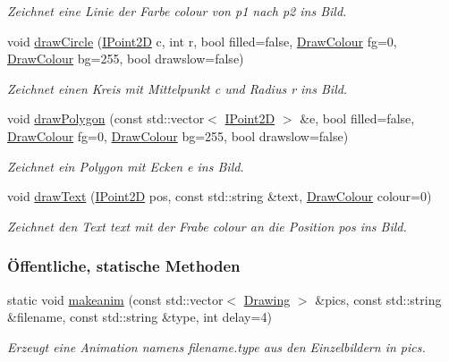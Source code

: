 \begin{DoxyCompactItemize}
\begin{DoxyCompactList}\small\item\em Zeichnet eine Linie der Farbe {\ttfamily colour} von {\ttfamily p1} nach {\ttfamily p2} ins Bild. \end{DoxyCompactList}\item 
void \mbox{\hyperlink{classDrawing_a28721ef60cde505e521e391f698f21fe}{draw\+Circle}} (\mbox{\hyperlink{point2d_8h_aeeeb57e4186edb0a4274b64925e0d0fb}{I\+Point2D}} c, int r, bool filled=false, \mbox{\hyperlink{classDrawColour}{Draw\+Colour}} fg=0, \mbox{\hyperlink{classDrawColour}{Draw\+Colour}} bg=255, bool drawslow=false)
\begin{DoxyCompactList}\small\item\em Zeichnet einen Kreis mit Mittelpunkt {\ttfamily c} und Radius {\ttfamily r} ins Bild. \end{DoxyCompactList}\item 
void \mbox{\hyperlink{classDrawing_ad449deed6b1939b2232158ce25d327ee}{draw\+Polygon}} (const std\+::vector$<$ \mbox{\hyperlink{point2d_8h_aeeeb57e4186edb0a4274b64925e0d0fb}{I\+Point2D}} $>$ \&e, bool filled=false, \mbox{\hyperlink{classDrawColour}{Draw\+Colour}} fg=0, \mbox{\hyperlink{classDrawColour}{Draw\+Colour}} bg=255, bool drawslow=false)
\begin{DoxyCompactList}\small\item\em Zeichnet ein Polygon mit Ecken {\ttfamily e} ins Bild. \end{DoxyCompactList}\item 
void \mbox{\hyperlink{classDrawing_afa0ebabdcc81eb06d4b67e6bb83cdc4d}{draw\+Text}} (\mbox{\hyperlink{point2d_8h_aeeeb57e4186edb0a4274b64925e0d0fb}{I\+Point2D}} pos, const std\+::string \&text, \mbox{\hyperlink{classDrawColour}{Draw\+Colour}} colour=0)
\begin{DoxyCompactList}\small\item\em Zeichnet den Text {\ttfamily text} mit der Frabe {\ttfamily colour} an die Position {\ttfamily pos} ins Bild. \end{DoxyCompactList}\end{DoxyCompactItemize}
\subsubsection*{Öffentliche, statische Methoden}
\begin{DoxyCompactItemize}
\item 
static void \mbox{\hyperlink{classDrawing_a3ef33783605b7ecd7159bcdb2fdd9a02}{makeanim}} (const std\+::vector$<$ \mbox{\hyperlink{classDrawing}{Drawing}} $>$ \&pics, const std\+::string \&filename, const std\+::string \&type, int delay=4)
\begin{DoxyCompactList}\small\item\em Erzeugt eine Animation namens {\ttfamily filename.\+type} aus den Einzelbildern in pics. \end{DoxyCompactList}\end{DoxyCompactItemize}
